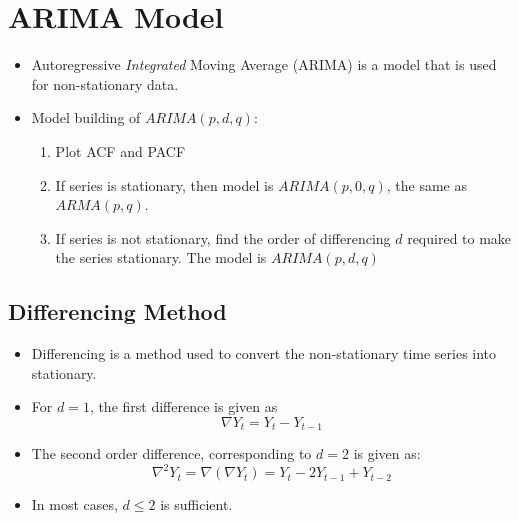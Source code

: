 \documentclass{article}
\theoremstyle{plain}
\theoremstyle{definition}
\begin{document}
\section{ARIMA Model}
\begin{itemize}
    \item Autoregressive \textit{Integrated} Moving Average (ARIMA) is a model that is used for non-stationary data.
    
    \item Model building of $ARIMA(p, d, q)$:
    \begin{enumerate}
    
        \item Plot ACF and PACF 
        
        \item If series is stationary, then model is $ARIMA(p, 0, q)$, the same as $ARMA(p, q)$. 
        
        \item If series is not stationary, find the order of differencing $d$ required to make the series stationary. The model is $ARIMA(p, d, q)$
    \end{enumerate}
\end{itemize}

\subsection{Differencing Method}
\begin{itemize}
    \item Differencing is a method used to convert the non-stationary time series into stationary. 
    \item For $d=1$, the first difference is given as
    \begin{equation*}
        \nabla Y_t = Y_t - Y_{t-1}
    \end{equation*}
    
    \item The second order difference, corresponding to $d=2$ is given as:
    \begin{equation*}
        \nabla^2 Y_t = \nabla(\nabla Y_t) = Y_t - 2Y_{t-1} + Y_{t-2}
    \end{equation*}
    
    \item In most cases, $d \le 2$ is sufficient. 
\end{itemize}
\end{document}
